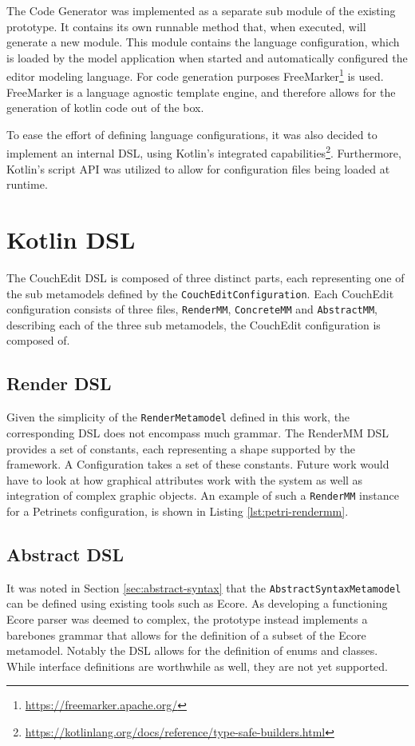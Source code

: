 The Code Generator was implemented as a separate sub module of the existing prototype. It contains its own runnable method that, when executed, will generate a new module. This module contains the language configuration, which is loaded by the model application when started and automatically configured the editor modeling language. For code generation purposes FreeMarker\footnote{\url{https://freemarker.apache.org/}} is used. FreeMarker is a language agnostic template engine, and therefore allows for the generation of kotlin code out of the box.

To ease the effort of defining language configurations, it was also decided to implement an internal DSL, using Kotlin's integrated capabilities\footnote{\url{https://kotlinlang.org/docs/reference/type-safe-builders.html}}. Furthermore, Kotlin's script API was utilized to allow for configuration files being loaded at runtime.

\section{Kotlin DSL}
The CouchEdit DSL is composed of three distinct parts, each representing one of the sub metamodels defined by the \texttt{CouchEditConfiguration}. Each CouchEdit configuration consists of three files, \texttt{RenderMM}, \texttt{ConcreteMM} and \texttt{AbstractMM}, describing each of the three sub metamodels, the CouchEdit configuration is composed of.

\subsection{Render DSL}
Given the simplicity of the \texttt{RenderMetamodel} defined in this work, the corresponding DSL does not encompass much grammar. The RenderMM DSL provides a set of constants, each representing a shape supported by the framework. A Configuration takes a set of these constants. Future work would have to look at how graphical attributes work with the system as well as integration of complex graphic objects. An example of such a \texttt{RenderMM} instance for a Petrinets configuration, is shown in Listing \ref{lst:petri-rendermm}.

\subsection{Abstract DSL}
It was noted in Section \ref{sec:abstract-syntax} that the \texttt{AbstractSyntaxMetamodel} can be defined using existing tools such as Ecore. As developing a functioning Ecore parser was deemed to complex, the prototype instead implements a barebones grammar that allows for the definition of a subset of the Ecore metamodel. Notably the DSL allows for the definition of enums and classes. While interface definitions are worthwhile as well, they are not yet supported.


